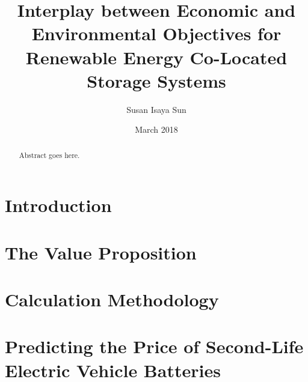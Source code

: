 \documentclass[a4paper]{18monthreport}
\begin{document}
\frontmatter
\title      {Interplay between Economic and Environmental Objectives for Renewable Energy Co-Located Storage Systems}
\date       {March 2018}
\author     {Susan Isaya Sun}

\maketitle

\begin{abstract}
Abstract goes here.
\end{abstract}

\tableofcontents
\listoffigures
\listoftables
\lstlistoflistings
{}
\mainmatter
\chapter{Introduction}
\label{sec:Introduction}


\chapter{The Value Proposition}
\label{sec:The Value Proposition}
%

\chapter{Calculation Methodology}
\label{sec:Calculation Methodology}

\chapter{Predicting the Price of Second-Life Electric Vehicle Batteries}
\label{sec:Predicting the Price of Second-Life Electric Vehicle Batteries}
%
\end{document}
